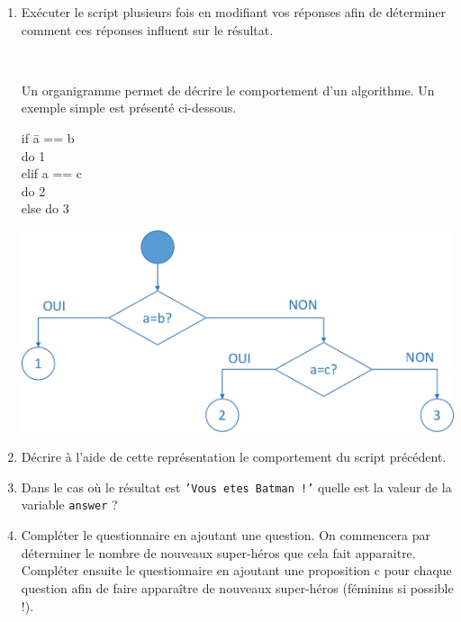 \begin{exercice}

\begin{enumerate}
\item Exécuter le script plusieurs fois en modifiant vos réponses afin de déterminer comment ces réponses influent sur le résultat.

~\

Un organigramme permet de décrire le comportement d'un algorithme. Un exemple simple est présenté ci-dessous.

\begin{minipage}{.2\linewidth}
\ttfamily

\begin{tabbing}
if \= a == b \\
\> do 1 \\
elif a == c \\
\> do 2 \\
else do 3
\end{tabbing}

\rmfamily

\end{minipage}\hfill
\begin{minipage}{.7\linewidth}
\includegraphics[width=0.6\linewidth]{img/Organigramme}
\end{minipage}
\item Décrire à l'aide de cette représentation le comportement du script précédent.
\item Dans le cas où le résultat est \texttt{'Vous etes Batman !'} quelle est la valeur de la variable \texttt{answer} ?
\item Compléter le questionnaire en ajoutant une question. On commencera par déterminer le nombre de nouveaux super-héros que cela fait apparaitre. \\
Compléter ensuite le questionnaire en ajoutant une proposition \og c \fg pour chaque question afin de faire apparaître de nouveaux super-héros (féminins si possible !).
\end{enumerate}
\end{exercice}



